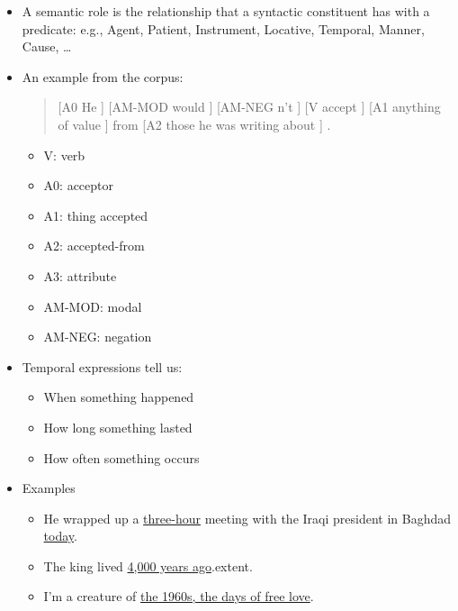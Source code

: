 \documentclass[a4paper,landscape,headrule,footrule,xetex]{foils}
\begin{document}
\begin{itemize}
\item A semantic role is the relationship that a syntactic constituent
  has with a predicate: e.g., Agent, Patient, Instrument, Locative,
  Temporal, Manner, Cause, \ldots
\item An example from the  corpus:
  \begin{quote}
  [A0 He ] [AM-MOD would ] [AM-NEG n't ] [V accept ] [A1 anything of value ] from [A2 those he was writing about ] . 
  \end{quote}
  \begin{itemize}
  \item V: verb
  \item  A0: acceptor
  \item  A1: thing accepted
  \item  A2: accepted-from
  \item  A3: attribute
  \item  AM-MOD: modal
  \item  AM-NEG: negation 
  \end{itemize}
\end{itemize}


\begin{itemize}
\item Temporal expressions tell us:
  \begin{itemize}
  \item When something happened
  \item How long something lasted
  \item How often something occurs
  \end{itemize}
\item Examples
  \begin{itemize}
  \item  He wrapped up a \ul{three-hour} meeting with the Iraqi president in
    Baghdad \ul{today}.
  \item The king lived \ul{4,000 years ago}.extent.
  \item I’m a creature of \ul{the 1960s, the days of free love}.
  \end{itemize}
\end{itemize}
\end{document}
